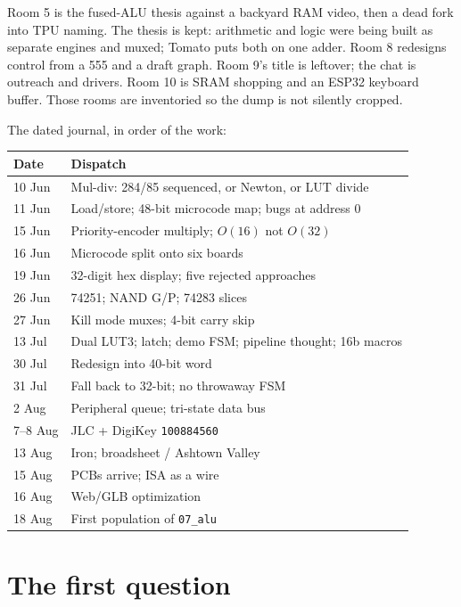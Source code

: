 \documentclass[11pt,openany]{book}
\begin{document}
Room 5 is the fused-ALU thesis against a backyard RAM video, then a dead fork into TPU naming. The thesis is kept: arithmetic and logic were being built as separate engines and muxed; Tomato puts both on one adder. Room 8 redesigns control from a 555 and a draft graph. Room 9's title is leftover; the chat is outreach and drivers. Room 10 is SRAM shopping and an ESP32 keyboard buffer. Those rooms are inventoried so the dump is not silently cropped.

The dated journal, in order of the work:

\begin{center}
\small
\begin{tabular}{@{}lp{9.2cm}@{}}
\toprule
Date & Dispatch \\
\midrule
10 Jun & Mul-div: 284/85 sequenced, or Newton, or LUT divide \\
11 Jun & Load/store; 48-bit microcode map; bugs at address 0 \\
15 Jun & Priority-encoder multiply; $O(16)$ not $O(32)$ \\
16 Jun & Microcode split onto six boards \\
19 Jun & 32-digit hex display; five rejected approaches \\
26 Jun & 74251; NAND G/P; 74283 slices \\
27 Jun & Kill mode muxes; 4-bit carry skip \\
13 Jul & Dual LUT3; latch; demo FSM; pipeline thought; 16b macros \\
30 Jul & Redesign into 40-bit word \\
31 Jul & Fall back to 32-bit; no throwaway FSM \\
2 Aug & Peripheral queue; tri-state data bus \\
7--8 Aug & JLC + DigiKey \texttt{100884560} \\
13 Aug & Iron; broadsheet / Ashtown Valley \\
15 Aug & PCBs arrive; ISA as a wire \\
16 Aug & Web/GLB optimization \\
18 Aug & First population of \texttt{07\_alu} \\
\bottomrule
\end{tabular}
\end{center}

\chapter{The first question}
\end{document}
